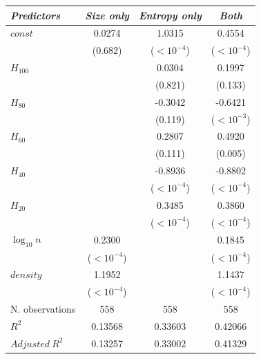 \begin{tabular}{lccc}
\toprule
\textit{Predictors} & \textit{Size only} & \textit{Entropy only} & \textit{Both} \\
\midrule
$\mathit{const}$ & 0.0274 & 1.0315 & 0.4554 \\
 & {\scriptsize (0.682)} & {\scriptsize ($<10^{-4}$)} & {\scriptsize ($<10^{-4}$)} \\
$H_{100}$ &  & 0.0304 & 0.1997 \\
 &  & {\scriptsize (0.821)} & {\scriptsize (0.133)} \\
$H_{80}$ &  & -0.3042 & -0.6421 \\
 &  & {\scriptsize (0.119)} & {\scriptsize ($<10^{-3}$)} \\
$H_{60}$ &  & 0.2807 & 0.4920 \\
 &  & {\scriptsize (0.111)} & {\scriptsize (0.005)} \\
$H_{40}$ &  & -0.8936 & -0.8802 \\
 &  & {\scriptsize ($<10^{-4}$)} & {\scriptsize ($<10^{-4}$)} \\
$H_{20}$ &  & 0.3485 & 0.3860 \\
 &  & {\scriptsize ($<10^{-4}$)} & {\scriptsize ($<10^{-4}$)} \\
$\log_{10} n$ & 0.2300 &  & 0.1845 \\
 & {\scriptsize ($<10^{-4}$)} &  & {\scriptsize ($<10^{-4}$)} \\
$\mathit{density}$ & 1.1952 &  & 1.1437 \\
 & {\scriptsize ($<10^{-4}$)} &  & {\scriptsize ($<10^{-4}$)} \\
\midrule
N. observations & 558 & 558 & 558 \\
$R^2$ & 0.13568 & 0.33603 & 0.42066 \\
$\mathit{Adjusted}~R^2$ & 0.13257 & 0.33002 & 0.41329 \\
\bottomrule
\end{tabular}

